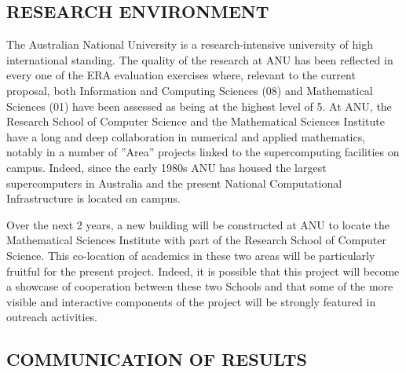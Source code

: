 \documentclass[a4paper,fontsize=12pt]{scrartcl}
\begin{document}
\subsection*{RESEARCH ENVIRONMENT}

The Australian National University is a research-intensive university
of high international standing. The quality of the research at ANU has
been reflected in every one of the ERA evaluation exercises where,
relevant to the current proposal, both Information and Computing
Sciences (08) and Mathematical Sciences (01) have been assessed as
being at the highest level of 5. At ANU, the Research School of
Computer Science and the Mathematical Sciences Institute have a long
and deep collaboration in numerical and applied mathematics, notably
in a number of ''Area'' projects linked to the supercomputing
facilities on campus. Indeed, since the early 1980s ANU has housed the
largest supercomputers in Australia and the present National
Computational Infrastructure is located on campus.

Over the next 2 years, a new building will be constructed at ANU to
locate the Mathematical Sciences Institute with part of the Research
School of Computer Science. This co-location of academics in these two
areas will be particularly fruitful for the present project. Indeed,
it is possible that this project will become a showcase of cooperation
between these two Schools and that some of the more visible and
interactive components of the project will be strongly featured in
outreach activities.




\subsection*{COMMUNICATION OF RESULTS}
\end{document}
